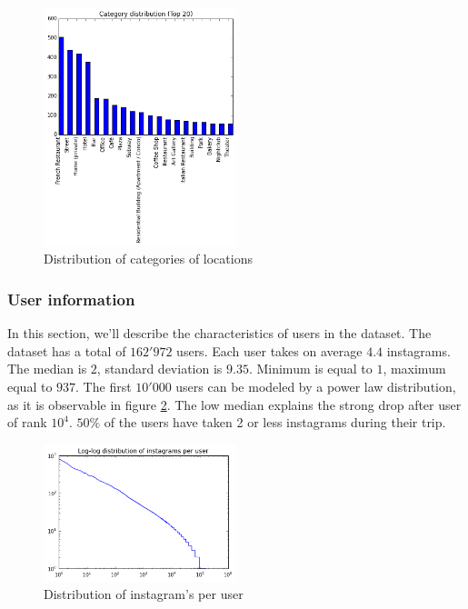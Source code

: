 \begin{figure}[h!]
  \centering
    \includegraphics[width=0.5\textwidth]{images/category_distribution}
  \caption{Distribution of categories of locations}
  \label{fig:category_distribution}
\end{figure}

\subsubsection{User information}

In this section, we'll describe the characteristics of users in the dataset. The dataset has a total of $162'972$ users. Each user takes on average $4.4$ instagrams. The median is $2$, standard deviation is $9.35$. Minimum is equal to $1$, maximum equal to $937$. The first $10'000$ users can be modeled by a power law distribution, as it is observable in figure \ref{fig:user_instagram}. The low median explains the strong drop after user of rank $10^4$. $50\%$ of the users have taken 2 or less instagrams during their trip. 

\begin{figure}[h!]
  \centering
    \includegraphics[width=0.5\textwidth]{images/user_instagram_log_log}
  \caption{Distribution of instagram's per user}
  \label{fig:user_instagram}
\end{figure}

